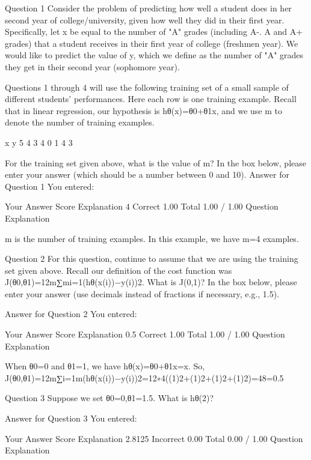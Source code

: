Question 1
Consider the problem of predicting how well a student does in her second year of college/university, given how well they did in their first year. Specifically, let x be equal to the number of "A" grades (including A-. A and A+ grades) that a student receives in their first year of college (freshmen year). We would like to predict the value of y, which we define as the number of "A" grades they get in their second year (sophomore year). 

Questions 1 through 4 will use the following training set of a small sample of different students' performances. Here each row is one training example. Recall that in linear regression, our hypothesis is hθ(x)=θ0+θ1x, and we use m to denote the number of training examples.

x	y
5	4
3	4
0	1
4	3

For the training set given above, what is the value of m? In the box below, please enter your answer (which should be a number between 0 and 10).
Answer for Question 1
You entered:

Your Answer		Score	Explanation
4	Correct	1.00	
Total		1.00 / 1.00	
Question Explanation

m is the number of training examples. In this example, we have m=4 examples.

Question 2
For this question, continue to assume that we are using the training set given above. Recall our definition of the cost function was J(θ0,θ1)=12m∑mi=1(hθ(x(i))−y(i))2. What is J(0,1)? In the box below, please enter your answer (use decimals instead of fractions if necessary, e.g., 1.5).

Answer for Question 2
You entered:

Your Answer		Score	Explanation
0.5	Correct	1.00	
Total		1.00 / 1.00	
Question Explanation

When θ0=0 and θ1=1, we have hθ(x)=θ0+θ1x=x. So, J(θ0,θ1)=12m∑i=1m(hθ(x(i))−y(i))2=12∗4((1)2+(1)2+(1)2+(1)2)=48=0.5

Question 3
Suppose we set θ0=0,θ1=1.5. What is hθ(2)?

Answer for Question 3
You entered:

Your Answer		Score	Explanation
2.8125	Incorrect	0.00	
Total		0.00 / 1.00	
Question Explanation

